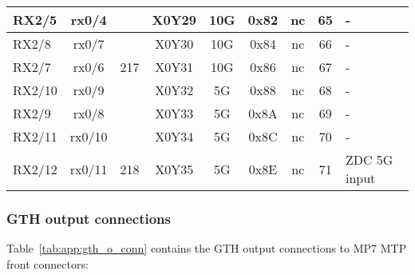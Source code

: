 \begin{longtable}{|l|c|c|c|c|c|c|c|l|}
RX2/5  & rx0/4  &     & X0Y29 & 10G & 0x82 & nc & 65 & -\\\hline
RX2/8  & rx0/7  &     & X0Y30 & 10G & 0x84 & nc & 66 & -\\\hline
RX2/7  & rx0/6  & 217 & X0Y31 & 10G & 0x86 & nc & 67 & -\\\hline
RX2/10 & rx0/9  &     & X0Y32 &  5G & 0x88 & nc & 68 & -\\\hline
RX2/9  & rx0/8  &     & X0Y33 &  5G & 0x8A & nc & 69 & -\\\hline
RX2/11 & rx0/10 &     & X0Y34 &  5G & 0x8C & nc & 70 & -\\\hline
RX2/12 & rx0/11 & 218 & X0Y35 &  5G & 0x8E & nc & 71 & ZDC 5G input\\\hline
\end{longtable}

\clearpage

\subsubsection{GTH output connections}\label{sec:app:gth_o_conn}

Table~\ref{tab:app:gth_o_conn} contains the GTH output connections to MP7 MTP front connectors:

